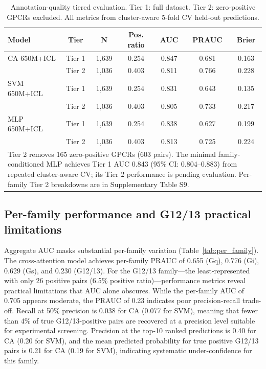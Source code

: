 \documentclass[11pt,a4paper]{article}
\begin{document}
\begin{table}[ht]
\centering
\caption{Annotation-quality tiered evaluation. Tier 1: full dataset. Tier 2: zero-positive GPCRs excluded. All metrics from cluster-aware 5-fold CV held-out predictions.}
\label{tab:label_tiers}
\begin{tabular}{lcccccc}
\toprule
Model & Tier & N & Pos. ratio & AUC & PRAUC & Brier \\
\midrule
CA 650M+ICL   & Tier 1 & 1,639 & 0.254 & 0.847 & 0.681 & 0.163 \\
              & Tier 2 & 1,036 & 0.403 & 0.811 & 0.766 & 0.228 \\
SVM 650M+ICL  & Tier 1 & 1,639 & 0.254 & 0.831 & 0.643 & 0.135 \\
              & Tier 2 & 1,036 & 0.403 & 0.805 & 0.733 & 0.217 \\
MLP 650M+ICL  & Tier 1 & 1,639 & 0.254 & 0.838 & 0.627 & 0.199 \\
              & Tier 2 & 1,036 & 0.403 & 0.813 & 0.725 & 0.224 \\
\bottomrule
\multicolumn{7}{p{0.88\textwidth}}{\small Tier 2 removes 165 zero-positive GPCRs (603 pairs). The minimal family-conditioned MLP achieves Tier 1 AUC 0.843 (95\% CI: 0.804--0.883) from repeated cluster-aware CV; its Tier 2 performance is pending evaluation. Per-family Tier 2 breakdowns are in Supplementary Table S9.} \\
\end{tabular}
\end{table}

\subsection{Per-family performance and G12/13 practical limitations}

Aggregate AUC masks substantial per-family variation (Table~\ref{tab:per_family}). The cross-attention model achieves per-family PRAUC of 0.655 (Gq), 0.776 (Gi), 0.629 (Gs), and 0.230 (G12/13). For the G12/13 family---the least-represented with only 26 positive pairs (6.5\% positive ratio)---performance metrics reveal practical limitations that AUC alone obscures. While the per-family AUC of 0.705 appears moderate, the PRAUC of 0.23 indicates poor precision-recall trade-off. Recall at 50\% precision is 0.038 for CA (0.077 for SVM), meaning that fewer than 4\% of true G12/13-positive pairs are recovered at a precision level suitable for experimental screening. Precision at the top-10 ranked predictions is 0.40 for CA (0.20 for SVM), and the mean predicted probability for true positive G12/13 pairs is 0.21 for CA (0.19 for SVM), indicating systematic under-confidence for this family.
\end{document}
